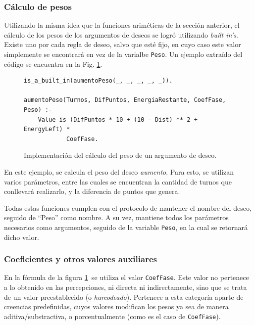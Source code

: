 \documentclass[oneside]{book}
\theoremstyle{definition}
\begin{document}
\subsubsection{Cálculo de pesos}

Utilizando la misma idea que la funciones ariméticas de la sección anterior, el
cálculo de los pesos de los argumentos de deseos se logró utilizando \textit{built 
in's}. Existe uno por cada regla de deseo, salvo que esté fijo, en cuyo caso 
este valor simplemente se encontrará en vez de la varialbe \texttt{Peso}. Un 
ejemplo extraído del código se encuentra en la Fig. \ref{fig:calculoDePeso}.

\begin{figure}
\begin{verbatim}
is_a_built_in(aumentoPeso(_, _, _, _, _)).

aumentoPeso(Turnos, DifPuntos, EnergiaRestante, CoefFase, Peso) :-
    Value is (DifPuntos * 10 + (10 - Dist) ** 2 + EnergyLeft) * 
    		CoefFase.
\end{verbatim}

\caption{Implementación del cálculo del peso de un argumento de deseo.}
\label{fig:calculoDePeso}
\end{figure}

En este ejemplo, se calcula el peso del deseo \emph{aumento}. Para esto, se utilizan
varios parámetros, entre las cuales se encuentran la cantidad de turnos que 
conllevará realizarlo, y la diferencia de puntos que genera.

Todas estas funciones cumplen con el protocolo de mantener el nombre del deseo,
seguido de ``Peso'' como nombre. A su vez, mantiene todos los parámetros 
necesarios como argumentos, seguido de la variable \texttt{Peso}, en la cual se 
retornará dicho valor.

\subsubsection{Coeficientes y otros valores auxiliares}

En la fórmula de la figura \ref{fig:calculoDePeso}\ se utiliza el valor 
\texttt{CoefFase}. Este valor no pertenece a lo obtenido en las percepciones, ni
directa ni indirectamente, sino que se trata de un valor preestablecido (o
\textit{harcodeado}). Pertenece a esta categoría aparte de creencias predefinidas,
cuyos valores modifican los pesos ya sea de manera aditiva/substractiva, o 
porcentualmente (como es el caso de \texttt{CoefFase}).
\end{document}
